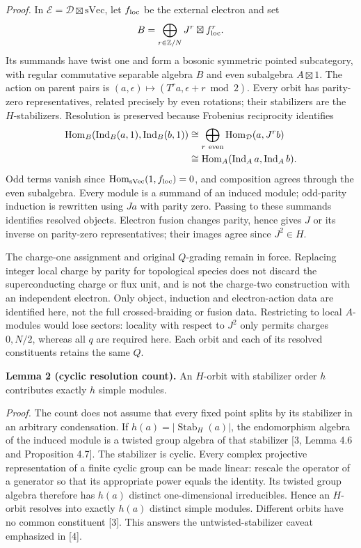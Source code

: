\documentclass[
  11pt,
]{article}
\begin{document}
\textit{Proof.} In \(\mathcal E=\mathcal D\boxtimes\mathrm{sVec}\),
let \(f_{\rm loc}\) be the external electron and set
\[
B=\bigoplus_{r\in\mathbb Z/N}J^r\boxtimes f_{\rm loc}^{r}.
\]
Its summands have twist one and form a bosonic symmetric pointed
subcategory, with regular commutative separable algebra \(B\) and even
subalgebra \(A\boxtimes1\). The action on parent pairs is
\((a,\epsilon)\mapsto(T^ra,\epsilon+r\bmod2)\). Every orbit has
parity-zero representatives, related precisely by even rotations;
their stabilizers are the \(H\)-stabilizers. Resolution is preserved
because Frobenius reciprocity identifies
\[
\begin{aligned}
\operatorname{Hom}_B(\operatorname{Ind}_B(a,1),\operatorname{Ind}_B(b,1))
&\cong\bigoplus_{r\ {\rm even}}\operatorname{Hom}_{\mathcal D}(a,J^rb)\\
&\cong\operatorname{Hom}_A(\operatorname{Ind}_A a,\operatorname{Ind}_A b).
\end{aligned}
\]
Odd terms vanish since \(\operatorname{Hom}_{\mathrm{sVec}}(1,f_{\rm loc})=0\),
and composition agrees through the even subalgebra. Every module is a
summand of an induced module; odd-parity induction is rewritten using
\(Ja\) with parity zero. Passing to these summands identifies resolved
objects. Electron fusion changes parity, hence gives \(J\) or its inverse
on parity-zero representatives; their images agree since \(J^2\in H\).

The charge-one assignment and original \(Q\)-grading remain in force.
Replacing integer local charge by parity for topological species does
not discard the superconducting charge or flux unit, and is not the
charge-two construction with an independent electron. Only object,
induction and electron-action data are identified here, not the full
crossed-braiding or fusion data.
Restricting to local \(A\)-modules would lose sectors: locality with
respect to \(J^2\) only permits charges \(0,N/2\), whereas all \(q\) are
required here. Each orbit and each of its resolved constituents retains
the same \(Q\).

\textbf{Lemma 2 (cyclic resolution count).} An \(H\)-orbit with
stabilizer order \(h\) contributes exactly \(h\) simple modules.

\textit{Proof.} The count does not assume that every fixed point
splits by its stabilizer in an arbitrary condensation. If
\(h(a)=|\operatorname{Stab}_H(a)|\), the endomorphism algebra of the
induced module is a twisted group algebra of that stabilizer {[}3, Lemma
4.6 and Proposition 4.7{]}. The stabilizer is cyclic. Every complex
projective representation of a finite cyclic group can be made linear:
rescale the operator of a generator so that its appropriate power equals
the identity. Its twisted group algebra therefore has \(h(a)\) distinct
one-dimensional irreducibles. Hence an \(H\)-orbit resolves into exactly
\(h(a)\) distinct simple modules. Different orbits have no common
constituent {[}3{]}. This answers the untwisted-stabilizer caveat
emphasized in {[}4{]}.
\end{document}
